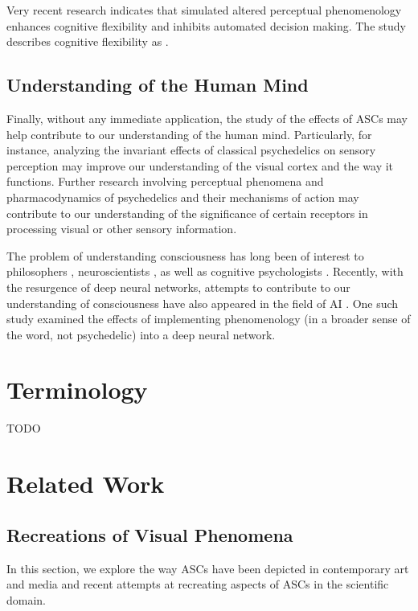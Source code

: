 Very recent research \autocite{rastelli2021simulated} indicates that simulated altered perceptual phenomenology enhances cognitive flexibility and inhibits automated decision making. The study describes cognitive flexibility as .

\subsection{Understanding of the Human Mind}
Finally, without any immediate application, the study of the effects of \acp{ASC} may help contribute to our understanding of the human mind. Particularly, for instance, analyzing the invariant effects of classical psychedelics on sensory perception may improve our understanding of the visual cortex and the way it functions.
Further research involving perceptual phenomena and pharmacodynamics of psychedelics and their mechanisms of action may contribute to our understanding of the significance of certain receptors in processing visual or other sensory information.

The problem of understanding consciousness has long been of interest to philosophers \autocite{block1993consciousness}, neuroscientists \autocite{crick1990towards}, as well as cognitive psychologists \autocite{dehaene2014consciousness}. Recently, with the resurgence of deep neural networks, attempts to contribute to our understanding of consciousness have also appeared in the field of \ac{AI} \autocites{bengio2017consciousness}{reggia2020artificial}. One such study \autocite{bensemann2021effects} examined the effects of implementing phenomenology (in a broader sense of the word, not psychedelic) into a deep neural network.

\section{Terminology}
TODO

\section{Related Work}

\subsection{Recreations of Visual Phenomena}
In this section, we explore the way \acp{ASC} have been depicted in contemporary art and media and recent attempts at recreating aspects of \acp{ASC} in the scientific domain.

